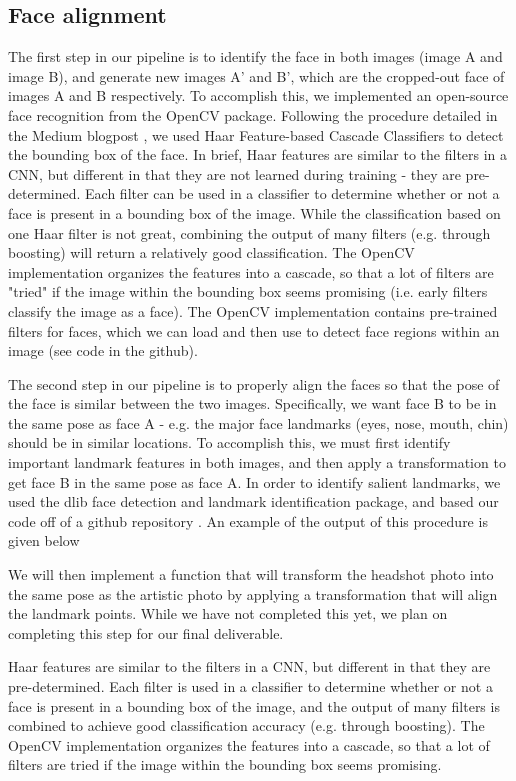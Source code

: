 \documentclass{article}
\begin{document}
\subsection{Face alignment}

The first step in our pipeline is to identify the face in both images (image A and image B), and generate new images A' and B', which are the cropped-out face of images A and B respectively. To accomplish this, we implemented an open-source face recognition from the OpenCV package. Following the procedure detailed in the Medium blogpost \cite{Medium}, we used Haar Feature-based Cascade Classifiers to detect the bounding box of the face. In brief, Haar features are similar to the filters in a CNN, but different in that they are not learned during training - they are pre-determined. Each filter can be used in a classifier to determine whether or not a face is present in a bounding box of the image. While the classification based on one Haar filter is not great, combining the output of many filters (e.g. through boosting) will return a relatively good classification. The OpenCV implementation organizes the features into a cascade, so that a lot of filters are "tried" if the image within the bounding box seems promising (i.e. early filters classify the image as a face). The OpenCV implementation contains pre-trained filters for faces, which we can load and then use to detect face regions within an image (see code in the github).

The second step in our pipeline is to properly align the faces so that the pose of the face is similar between the two images. Specifically, we want face B to be in the same pose as face A - e.g. the major face landmarks (eyes, nose, mouth, chin) should be in similar locations. To accomplish this, we must first identify important landmark features in both images, and then apply a transformation to get face B in the same pose as face A. In order to identify salient landmarks, we used the dlib face detection and landmark identification package, and based our code off of a github repository \cite{dlibgit}. An example of the output of this procedure is given below

We will then implement a function that will transform the headshot photo into the same pose as the artistic photo by applying a transformation that will align the landmark points. While we have not completed this yet, we plan on completing this step for our final deliverable. 

 Haar features are similar to the filters in a CNN, but different in that they are pre-determined. Each filter is used in a classifier to determine whether or not a face is present in a bounding box of the image, and the output of many filters is combined to achieve good classification accuracy (e.g. through boosting). The OpenCV implementation organizes the features into a cascade, so that a lot of filters are tried if the image within the bounding box seems promising. 
\end{document}
